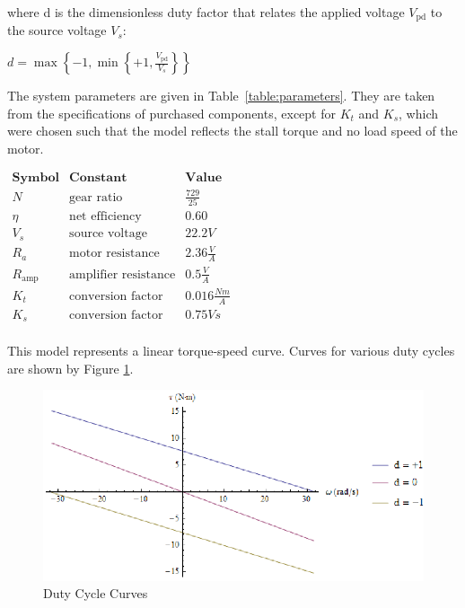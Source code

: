 \documentclass[11pt]{article}
\begin{document}
where d is the dimensionless duty factor that relates the applied voltage \(V_{\text{pd}}\) to the source voltage \(V_s\):

\begin{center}
\(d=\max \left\{-1, \min \left\{+1, \frac{V_{\text{pd}}}{V_s}\right\}\right\}\)
\end{center}

The system parameters are given in Table~\ref{table:parameters}. They are taken from the specifications of purchased components, except for \(K_t\) and \(K_s\), which were chosen such that the model reflects the stall torque and no load speed of the motor.

\begin{center}
\(\begin{array}{ccc}
 \textbf{Symbol} & \textbf{Constant} & \textbf{Value} \\
 N & \text{gear ratio} & \frac{729}{25} \\
 \eta  & \text{net efficiency} & 0.60 \\
 V_s & \text{source voltage} & 22.2V \\
 R_a & \text{motor resistance} & 2.36\frac{V}{A} \\
 R_{\text{amp}} & \text{amplifier resistance} & 0.5\frac{V}{A} \\
 K_t & \text{conversion factor} & 0.016\frac{N m}{A} \\
 K_s & \text{conversion factor} & 0.75V s \\
\end{array}\)
\label{table:parameters}
\end{center}

This model represents a linear torque-speed curve. Curves for various duty cycles are shown by Figure \ref{fig:dutycyclecurves}.

\begin{figure}[H]
\centering
\includegraphics{report_gr6.eps}
\caption{Duty Cycle Curves}
\label{fig:dutycyclecurves}
\end{figure}
\end{document}
